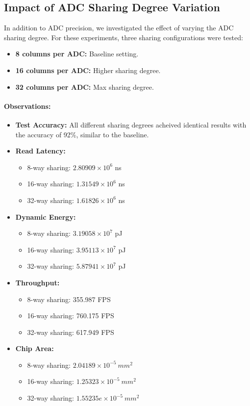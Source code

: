 \documentclass[11pt]{article}
\begin{document}
\subsection{Impact of ADC Sharing Degree Variation}
In addition to ADC precision, we investigated the effect of varying the ADC sharing degree. For these experiments, three sharing configurations were tested:
\begin{itemize}
    \item \textbf{8 columns per ADC:} Baseline setting.
    \item \textbf{16 columns per ADC:} Higher sharing degree.
    \item \textbf{32 columns per ADC:} Max sharing degree.
\end{itemize}
\paragraph{Observations:}
\begin{itemize}
    \item \textbf{Test Accuracy:} All different sharing degrees acheived identical results with the accuracy of 92\%, similar to the baseline.
    \item \textbf{Read Latency:} \begin{itemize}
            \item 8-way sharing: $2.80909\times10^6$ ns
            \item 16-way sharing: $1.31549\times10^6$ ns
            \item 32-way sharing: $1.61826\times10^6$ ns
        \end{itemize}
    \item \textbf{Dynamic Energy:} \begin{itemize}
            \item 8-way sharing: $3.19058\times10^7$ pJ
            \item 16-way sharing: $3.95113\times10^7$ pJ
            \item 32-way sharing: $5.87941\times10^7$ pJ
        \end{itemize}
    \item \textbf{Throughput:} \begin{itemize}
            \item 8-way sharing: 355.987 FPS
            \item 16-way sharing: 760.175 FPS
            \item 32-way sharing: 617.949 FPS
        \end{itemize}
    \item \textbf{Chip Area:} \begin{itemize}
            \item 8-way sharing: $2.04189\times10^{-5} ~{mm}^2$
            \item 16-way sharing: $1.25323\times10^{-5} ~{mm}^2$
            \item 32-way sharing: $1.55235e\times10^{-5} ~{mm}^2$
        \end{itemize}
\end{itemize}
\end{document}
